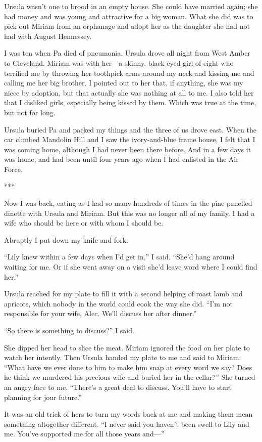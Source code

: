 {Ursula wasn’t one to brood in an empty house. She could have married again; she had money and was young and attractive for a big woman. What she did was to pick out Miriam from an orphanage and adopt her as the daughter she had not had with August Hennessey.

I was ten when Pa died of pneumonia. Ursula drove all night from West Amber to Cleveland. Miriam was with her—a skinny, black-eyed girl of eight who terrified me by throwing her toothpick arms around my neck and kissing me and calling me her big brother. I pointed out to her that, if anything, she was my niece by adoption, but that actually she was nothing at all to me. I also told her that I disliked girls, especially being kissed by them. Which was true at the time, but not for long.

Ursula buried Pa and packed my things and the three of us drove east. When the car climbed Mandolin Hill and I saw the ivory-and-blue frame house, I felt that I was coming home, although I had never been there before. And in a few days it was home, and had been until four years ago when I had enlisted in the Air Force.

***

Now I was back, eating as I had so many hundreds of times in the pine-panelled dinette with Ursula and Miriam. But this was no longer all of my family. I had a wife who should be here or with whom I should be.

Abruptly I put down my knife and fork.

“Lily knew within a few days when I’d get in,” I said. “She’d hang around waiting for me. Or if she went away on a visit she’d leave word where I could find her.”

Ursula reached for my plate to fill it with a second helping of roast lamb and apricots, which nobody in the world could cook the way she did. “I’m not responsible for your wife, Alec. We’ll discuss her after dinner.”

“So there is something to discuss?” I said.

She dipped her head to slice the meat. Miriam ignored the food on her plate to watch her intently. Then Ursula handed my plate to me and said to Miriam: “What have we ever done to him to make him snap at every word we say? Does he think we murdered his precious wife and buried her in the cellar?” She turned an angry face to me. “There’s a great deal to discuss. You’ll have to start planning for jour future.”

It was an old trick of hers to turn my words back at me and making them mean something altogether different. “I never said you haven’t been swell to Lily and me. You’ve supported me for all those years and—”

}
